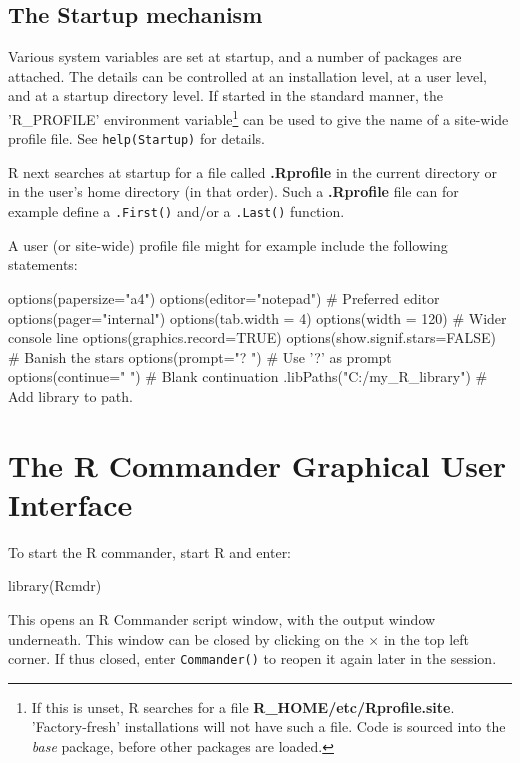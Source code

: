 \documentclass{tufte-book}\usepackage[]{graphicx}\usepackage[]{color}
\newcommand{\txtt}[1]{\texttt{#1}}
\begin{document}
\section{The Startup mechanism}

Various system variables are set at startup, and a number of packages
are attached.  The details can be controlled at an installation level,
at a user level, and at a startup directory level.  If started in the
standard manner, the 'R\_PROFILE' environment variable\footnote{If
  this is unset, R searches for a file {\bf
    R\_HOME/etc/Rprofile.site}.  'Factory-fresh' installations will
  not have such a file.  Code is sourced into the \textit{base}
  package, before other packages are loaded.} can be used to give the
name of a site-wide profile file.  See \txtt{help(Startup)} for
details.

R next searches at startup for a file called \textbf{.Rprofile} in the
current directory or in the user's home directory (in that
order).
Such a \textbf{.Rprofile} file can for example define a
\txtt{.First()} and/or a \txtt{.Last()} function.

A user (or site-wide) profile file might for example include the
following statements:
\begin{Schunk}
\begin{Sinput}
options(papersize="a4")
options(editor="notepad")         # Preferred editor
options(pager="internal")
options(tab.width = 4)
options(width = 120)              # Wider console line
options(graphics.record=TRUE)
options(show.signif.stars=FALSE)  # Banish the stars
options(prompt="? ")              # Use '?' as prompt
options(continue="  ")            # Blank continuation
.libPaths("C:/my_R_library")      # Add library to path.
\end{Sinput}
\end{Schunk}
% 
\cleartooddpage

\chapter{The R Commander Graphical User Interface}





To start the R commander, start R and enter:
\begin{Schunk}
\begin{Sinput}
library(Rcmdr)
\end{Sinput}
\end{Schunk}
This opens an R Commander script window, with the output window
underneath.  
This window can be closed by clicking on the {\large
  \texttt{$\times$}} in the top left corner. If thus closed,
enter \txtt{Commander()} to reopen it again later in the session.
\end{document}
